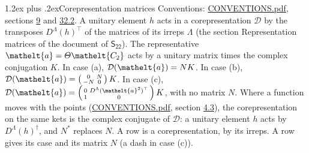 \documentclass[10pt,a4paper]{article}
\makeatletter
\renewcommand\section{\@startsection{section}{1}{\z@}{-3ex plus -1ex minus -.2ex}%
  {1.2ex plus .2ex}{\normalfont\large\sffamily\bfseries\color{parttitle}}}
\numberwithin{equation}{section}
\newcommand{\eltfont}[1]{{\let\sigma\eltsigma\mathelt{#1}}}
\newcommand{\grp}[1]{\mathsf{#1}}
\newcommand{\elt}[1]{\eltfont{#1}}
\makeatother
\begin{document}
\section{Corepresentation matrices}\label{s:corep_matrices}
Conventions: \href{../../CONVENTIONS.pdf}{CONVENTIONS.pdf}, sections \href{../../../rotation/CONVENTIONS.pdf\#conv.9}{9} and \href{../../CONVENTIONS.pdf\#conv.32.2}{32.2}.
A unitary element $h$ acts in a corepresentation $\mathcal{D}$ by the transposes $D^{\Lambda}(h)^{\top}$ of the matrices of its irreps $\Lambda$ (the section Representation matrices of the document of \href{../../../rotation/data/pdf/S22.pdf}{$\grp{S_{22}}$}). The representative $\elt{a} = \varTheta\elt{C_{2}}$ acts by a unitary matrix times the complex conjugation $K$.
In case (a), $\mathcal{D}(\elt{a}) = NK$. In case (b), $\mathcal{D}(\elt{a}) = \left(\begin{smallmatrix} 0 & N \\ -N & 0 \end{smallmatrix}\right) K$. In case (c), $\mathcal{D}(\elt{a}) = \left(\begin{smallmatrix} 0 & D^{\Lambda}(\elt{a}^2)^{\top} \\ 1 & 0 \end{smallmatrix}\right) K$, with no matrix $N$.
Where a function moves with the points (\href{../../CONVENTIONS.pdf}{CONVENTIONS.pdf}, section \href{../../../rotation/CONVENTIONS.pdf\#conv.4.3}{4.3}), the corepresentation on the same kets is the complex conjugate of $\mathcal{D}$: a unitary element $h$ acts by $D^{\Lambda}(h)^{\dagger}$, and $N^{*}$ replaces $N$.
A row is a corepresentation, by its irreps. A row gives its case and its matrix $N$ (a dash in case (c)).
\end{document}
